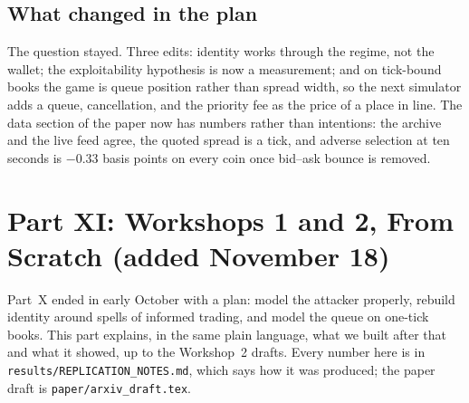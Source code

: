 \documentclass[11pt]{article}
\begin{document}
\subsection{What changed in the plan}
The question stayed. Three edits: identity works through the regime, not the wallet; the exploitability
hypothesis is now a measurement; and on tick-bound books the game is queue position rather than spread
width, so the next simulator adds a queue, cancellation, and the priority fee as the price of a place in
line. The data section of the paper now has numbers rather than intentions: the archive and the live
feed agree, the quoted spread is a tick, and adverse selection at ten seconds is $-0.33$ basis points on
every coin once bid--ask bounce is removed.

\section{Part XI: Workshops 1 and 2, From Scratch (added November 18)}\label{sec:ws12}
Part~X ended in early October with a plan: model the attacker properly, rebuild identity around
spells of informed trading, and model the queue on one-tick books. This part explains, in the same
plain language, what we built after that and what it showed, up to the Workshop~2 drafts. Every number
here is in \texttt{results/REPLICATION\_NOTES.md}, which says how it was produced; the paper draft is
\texttt{paper/arxiv\_draft.tex}.
\end{document}
